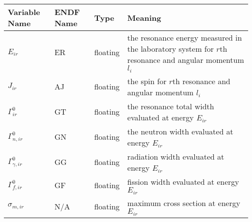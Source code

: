\begin{small}
\begin{tabular}{l l l L{6cm}}
Variable Name & ENDF Name & Type & Meaning \\\hline
$E_{ir}$ & ER & floating & the resonance energy measured in the laboratory system for $r$th resonance and angular momentum $l_i$ \\
$J_{ir}$ & AJ & floating & the spin for $r$th resonance and angular momentum $l_i$\\
$\Gamma_{ir}^0$ & GT & floating & the resonance total width evaluated at energy $E_{ir}$ \\
$\Gamma_{n,ir}^0$ & GN & floating & the neutron width evaluated at energy $E_{ir}$ \\
$\Gamma_{\gamma,ir}^0$ & GG & floating & radiation width evaluated at energy $E_{ir}$ \\
$\Gamma_{f,ir}^0$ & GF & floating & fission width evaluated at energy $E_{ir}$\\
$\sigma_{m,ir}$ & N/A & floating & maximum cross section at energy $E_{ir}$
\end{tabular}
\end{small}
\\\\

